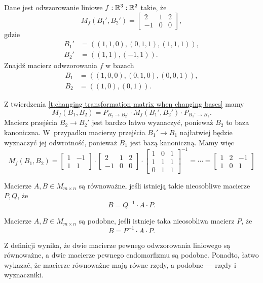 \begin{example}
    Dane jest odwzorowanie liniowe $f : \mathbb R^3 : \mathbb R^2$ takie, że
    \[ M_f(B_1', B_2') = \begin{bmatrix}
        2 & 1 & 2 \\
        -1 & 0 & 0
    \end{bmatrix}, \]
    gdzie
    \begin{align*}
        B_1' &= ((1, 1, 0), (0, 1, 1), (1, 1, 1)), \\
        B_2' &= ((1, 1), (-1, 1)).
    \end{align*}
    Znajdź macierz odwzorowania $f$ w bazach
    \begin{align*}
        B_1 &= ((1, 0, 0), (0, 1, 0), (0, 0, 1)), \\
        B_2 &= ((1, 0), (0, 1)).
    \end{align*}
\end{example}
\begin{solution}
    Z twierdzenia \ref{t:changing transformation matrix when changing bases} mamy
    \[ M_f(B_1, B_2) = P_{B_2 \to B_2'} \cdot M_f(B_1', B_2') \cdot P_{B_1' \to B_1}. \]
    Macierz przejścia $B_2 \to B_2'$ jest bardzo łatwo wyznaczyć, ponieważ $B_2$ to baza kanoniczna. W~przypadku macierzy przejścia $B_1' \to B_1$ najłatwiej będzie wyznaczyć jej odwrotność, ponieważ $B_1$ jest bazą kanoniczną. Mamy więc
    \[ M_f(B_1, B_2) = \begin{bmatrix}
        1 & -1 \\
        1 & 1
    \end{bmatrix} \cdot \begin{bmatrix}
        2 & 1 & 2 \\
        -1 & 0 & 0
    \end{bmatrix} \cdot \begin{bmatrix}
        1 & 0 & 1\\
        1 & 1 & 1\\
        0 & 1 & 1
    \end{bmatrix}^{-1} = \cdots = \begin{bmatrix}
        1 & 2 & -1 \\
        1 & 0 & 1
    \end{bmatrix} \]
\end{solution}

\begin{definition}
    \label{d:matrix equivalence}
    Macierze $A, B \in M_{m\times n}$ są równoważne, jeśli istnieją takie nieosobliwe macierze $P, Q$, że
    \[ B = Q^{-1} \cdot A \cdot P. \]
\end{definition}

\begin{definition}
    \label{d:matrix similarity}
    Macierze $A, B \in M_{m\times n}$ są podobne, jeśli istnieje taka nieosobliwa macierz $P$, że
    \[ B = P^{-1} \cdot A \cdot P. \]
\end{definition}

Z definicji wynika, że dwie macierze pewnego odwzorowania liniowego są równoważne, a dwie macierze pewnego endomorfizmu są podobne. Ponadto, łatwo wykazać, że macierze równoważne mają równe rzędy, a podobne --- rzędy i wyznaczniki.